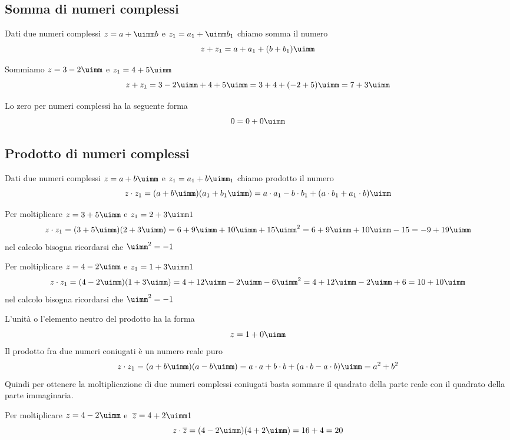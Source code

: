 \subsection{Somma di numeri complessi}
\begin{definizione}
Dati due numeri complessi  $z=a+\uimm b$ e  $z_1=a_1+\uimm b_1$ chiamo somma il numero \[z+z_1=a+a_1+(b+b_1)\uimm\]
\end{definizione}
\begin{esempio}
Sommiamo $z=3-2\uimm$ e $z_1=4+5\uimm$
	\[z+z_1=3-2\uimm +4+5\uimm=3+4+(-2+5)\uimm=7+3\uimm\]
\end{esempio}
Lo zero per numeri complessi ha la seguente forma
\[0=0+0\uimm\]
\subsection{Prodotto di numeri complessi}
\begin{definizione}
	Dati due numeri complessi  $z=a+b\uimm $ e  $z_1=a_1+b\uimm _1$ chiamo prodotto il numero \[z\cdot z_1=(a+b\uimm)(a_1+b_1\uimm)=a\cdot a_1-b\cdot b_1+(a\cdot b_1+a_1\cdot b)\uimm\]
\end{definizione}
\begin{esempio}
	Per moltiplicare $z=3+5\uimm $ e  $z_1=2+3\uimm1$  \[z\cdot z_1=(3+5\uimm)(2+3\uimm)= 6+9\uimm +10\uimm +15\uimm^2=6+9\uimm +10\uimm -15 =-9+19\uimm \]
	nel calcolo bisogna ricordarsi che $\uimm^2=-1$
\end{esempio}
\begin{esempio}
	Per moltiplicare $z=4-2\uimm $ e  $z_1=1+3\uimm1$  \[z\cdot z_1=(4-2\uimm)(1+3\uimm)= 4+12\uimm -2\uimm -6\uimm^2= 4+12\uimm -2\uimm +6=10+10\uimm \]
	nel calcolo bisogna ricordarsi che $\uimm^2=-1$
\end{esempio}

L'unità o l'elemento neutro del prodotto ha la forma\[z=1+0\uimm\] 
Il prodotto fra due numeri coniugati  è un numero reale puro
\[z\cdot z_1=(a+b\uimm)(a-b\uimm)=a\cdot a+b\cdot b+(a\cdot b-a\cdot b)\uimm=a^2+b^2\]
Quindi per ottenere la moltiplicazione di due numeri complessi coniugati basta sommare il quadrato della parte reale con il quadrato della parte immaginaria.
\begin{esempio}
	Per moltiplicare $z=4-2\uimm $ e\  $\overline{z}=4+2\uimm1$  \[z\cdot \overline{z}=(4-2\uimm)(4+2\uimm)= 16+4=20\]
\end{esempio}
